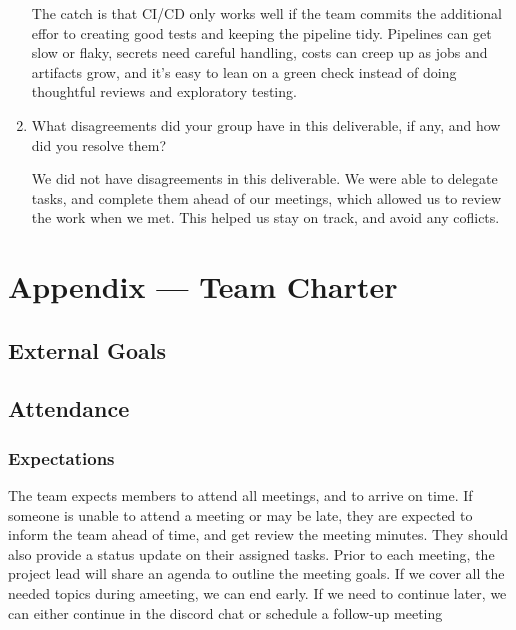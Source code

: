 \documentclass{article}
\begin{document}
\begin{enumerate}
The catch is that CI/CD only works well if the team commits the additional effor to creating good tests and keeping the pipeline tidy. Pipelines can get slow or flaky, secrets need careful handling, costs can creep up as jobs and artifacts grow, and it’s easy to lean on a green check instead of doing thoughtful reviews and exploratory testing.

    \item What disagreements did your group have in this deliverable, if any,
    and how did you resolve them?

    We did not have disagreements in this deliverable. We were able to delegate tasks, and complete them ahead of our meetings, which allowed us to review the work when we met. This helped us stay on track, and avoid any coflicts. 
\end{enumerate}

\newpage{}

\section*{Appendix --- Team Charter}



\subsection*{External Goals}

\begin{comment}
\wss{What are your team's external goals for this project? These are not the
goals related to the functionality or quality fo the project.  These are the
goals on what the team wishes to achieve with the project.  Potential goals are
to win a prize at the Capstone EXPO, or to have something to talk about in
interviews, or to get an A+, etc.}
\end{comment}

\subsection*{Attendance}

\subsubsection*{Expectations}

\begin{comment}
\wss{What are your team's expectations regarding meeting attendance (being on
time, leaving early, missing meetings, etc.)?}
\end{comment}
The team expects members to attend all meetings, and to arrive on time. If someone is unable to attend a meeting or may be late, they are expected to inform the team ahead of time, and get review the meeting minutes. They should also provide a status update on their assigned tasks. Prior to each meeting, the project lead will share an agenda to outline the meeting goals. If we cover all the needed topics during ameeting, we can end early. If we need to continue later, we can either continue in the discord chat or schedule a follow-up meeting
\end{document}
